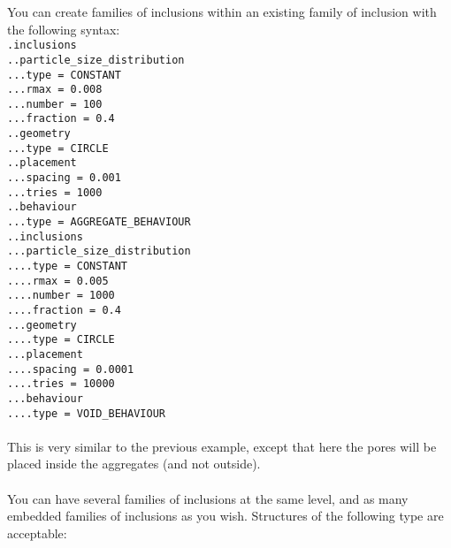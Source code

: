 \documentclass[10pt]{article}
\begin{document}
You can create families of inclusions within an existing family of inclusion with the following syntax:\\

\noindent \verb+.inclusions+\\
\verb+..particle_size_distribution+\\
\verb+...type = CONSTANT+\\
\verb+...rmax = 0.008+\\
\verb+...number = 100+\\
\verb+...fraction = 0.4+\\
\verb+..geometry+\\
\verb+...type = CIRCLE+\\
\verb+..placement+\\
\verb+...spacing = 0.001+\\
\verb+...tries = 1000+\\
\verb+..behaviour+\\
\verb+...type = AGGREGATE_BEHAVIOUR+\\
\verb+..inclusions+\\
\verb+...particle_size_distribution+\\
\verb+....type = CONSTANT+\\
\verb+....rmax = 0.005+\\
\verb+....number = 1000+\\
\verb+....fraction = 0.4+\\
\verb+...geometry+\\
\verb+....type = CIRCLE+\\
\verb+...placement+\\
\verb+....spacing = 0.0001+\\
\verb+....tries = 10000+\\
\verb+...behaviour+\\
\verb+....type = VOID_BEHAVIOUR+

\paragraph{}This is very similar to the previous example, except that here the pores will be placed inside the aggregates (and not outside). 

\paragraph{}You can have several families of inclusions at the same level, and as many embedded families of inclusions as you wish. Structures of the following type are acceptable:\\
\end{document}

